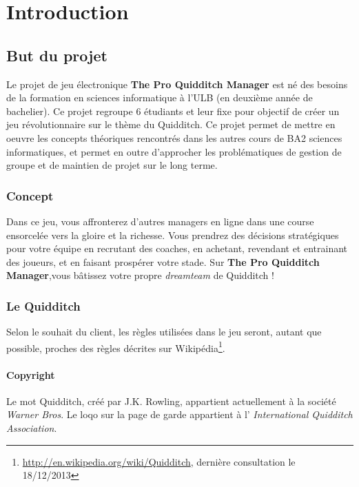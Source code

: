 \documentclass[a4paper, 11pt]{report}
\begin{document}

\tableofcontents

\chapter{Introduction}

\section{But du projet}
Le projet de jeu électronique \textbf{The Pro Quidditch Manager} est né des besoins de la formation
en sciences informatique à l'ULB (en deuxième année de bachelier). Ce projet regroupe 6 étudiants et leur fixe pour objectif de créer un jeu révolutionnaire sur le thème du Quidditch. Ce projet permet
de mettre en oeuvre les concepts théoriques rencontrés dans les autres cours de 
BA2 sciences informatiques, et permet en outre d'approcher les problématiques de 
gestion de groupe et de maintien de projet sur le long terme.

\subsection{Concept}
Dans ce jeu, vous affronterez d'autres \gls{manager}s en ligne dans une course ensorcelée
vers la gloire et la richesse. Vous prendrez des décisions stratégiques pour votre
équipe en recrutant des coaches, en achetant, revendant et entrainant des joueurs, et en faisant prospérer votre stade. 
Sur \textbf{The Pro Quidditch Manager},vous bâtissez votre propre \textit{dreamteam} de Quidditch !

\subsection{Le Quidditch}
Selon le souhait du client, les règles utilisées dans le jeu seront, autant que possible, proches des règles décrites sur Wikipédia\footnote{\url{http://en.wikipedia.org/wiki/Quidditch}, dernière consultation le 18/12/2013}.

\subsubsection*{Copyright}
Le mot Quidditch, créé par J.K. Rowling, appartient actuellement à la société \emph{Warner Bros}.
Le loqo sur la page de garde appartient à l' \emph{International Quidditch Association}.
\end{document}
